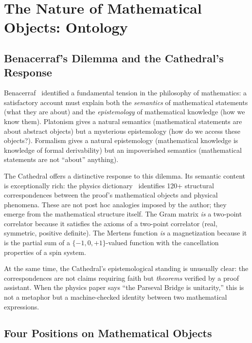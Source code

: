 \section{The Nature of Mathematical Objects: Ontology}
\label{sec:ontology}

\subsection{Benacerraf's Dilemma and the Cathedral's Response}

Benacerraf~\cite{benacerraf1973} identified a fundamental tension in
the philosophy of mathematics: a satisfactory account must explain
both the \emph{semantics} of mathematical statements (what they are
about) and the \emph{epistemology} of mathematical knowledge (how we
know them). Platonism gives a natural semantics (mathematical
statements are about abstract objects) but a mysterious epistemology
(how do we access these objects?). Formalism gives a natural
epistemology (mathematical knowledge is knowledge of formal
derivability) but an impoverished semantics (mathematical statements
are not ``about'' anything).

The Cathedral offers a distinctive response to this dilemma. Its
semantic content is exceptionally rich: the physics
dictionary~\cite{cathedral-physics} identifies 120+ structural
correspondences between the proof's mathematical objects and physical
phenomena. These are not post hoc analogies imposed by the author;
they emerge from the mathematical structure itself. The Gram matrix
\emph{is} a two-point correlator because it satisfies the axioms of a
two-point correlator (real, symmetric, positive definite). The Mertens
function \emph{is} a magnetization because it is the partial sum of
a $\{-1, 0, +1\}$-valued function with the cancellation properties
of a spin system.

At the same time, the Cathedral's epistemological standing is
unusually clear: the correspondences are not claims requiring faith
but \emph{theorems} verified by a proof assistant. When the physics
paper says ``the Parseval Bridge is unitarity,'' this is not a
metaphor but a machine-checked identity between two mathematical
expressions.

\subsection{Four Positions on Mathematical Objects}

